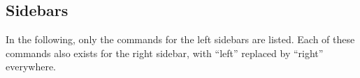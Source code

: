 











\subsection{Sidebars}

\label{section-sidebar-templates}

In the following, only the commands for the left sidebars are
listed. Each of these commands also exists for the right sidebar,
with ``left'' replaced by ``right'' everywhere.


